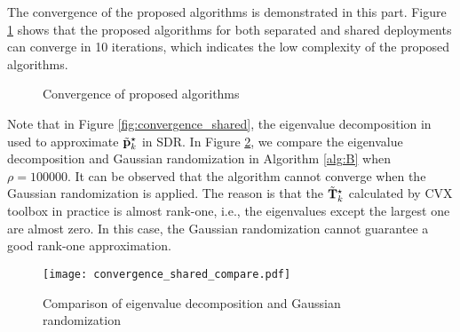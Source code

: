 The convergence of the proposed algorithms is demonstrated in this part. Figure \ref{fig:convergence} shows that the proposed
algorithms for both separated and shared deployments can converge in 10 iterations, which indicates the low complexity of the 
proposed algorithms.
\newpage

\begin{figure}[ht]
    \centering
    \caption{Convergence of proposed algorithms}
    \label{fig:convergence}
\end{figure}

Note that in Figure \ref{fig:convergence_shared}, the eigenvalue decomposition in used to approximate $\tilde{\bf p}_k^\star$ 
in SDR. In Figure \ref{fig:convergence_compare}, we compare the eigenvalue decomposition and Gaussian randomization in Algorithm \ref{alg:B}
when $\rho=100000$. It can be observed that the algorithm cannot converge when the Gaussian randomization is applied. 
The reason is that the $\tilde{\bf T}_k^\star$ calculated by CVX toolbox in practice is almost rank-one, i.e., the eigenvalues except
the largest one are almost zero. In this case, the Gaussian randomization cannot guarantee a good rank-one approximation.

\begin{figure}[ht]
    \centering
    \texttt{[image: convergence\_shared\_compare.pdf]}
    \caption{Comparison of eigenvalue decomposition and Gaussian randomization}
    \label{fig:convergence_compare}
\end{figure}
